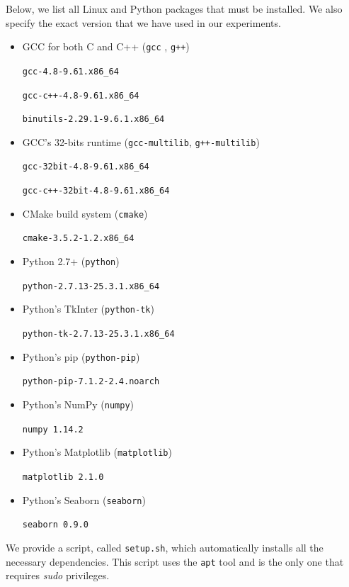 {Below, we list all Linux and Python packages that must be installed. We also specify the exact version that we have used in our experiments.

\begin{itemize}
  \item GCC for both C and C++ (\texttt{gcc} , \texttt{g++})

\texttt{gcc-4.8-9.61.x86\_64}

\texttt{gcc-c++-4.8-9.61.x86\_64}

\texttt{binutils-2.29.1-9.6.1.x86\_64}

  \item GCC's 32-bits runtime (\texttt{gcc-multilib}, \texttt{g++-multilib})

\texttt{gcc-32bit-4.8-9.61.x86\_64}

\texttt{gcc-c++-32bit-4.8-9.61.x86\_64}

  \item CMake build system (\texttt{cmake})

\texttt{cmake-3.5.2-1.2.x86\_64}

  \item Python 2.7+ (\texttt{python})

\texttt{python-2.7.13-25.3.1.x86\_64}

  \item Python's TkInter (\texttt{python-tk})

\texttt{python-tk-2.7.13-25.3.1.x86\_64}

  \item Python's pip (\texttt{python-pip})

\texttt{python-pip-7.1.2-2.4.noarch}

  \item Python's NumPy (\texttt{numpy})

\texttt{numpy 1.14.2}

  \item Python's Matplotlib (\texttt{matplotlib})

\texttt{matplotlib 2.1.0}

  \item Python's Seaborn (\texttt{seaborn})

\texttt{seaborn 0.9.0}

\end{itemize}

We provide a script, called \texttt{setup.sh}, which automatically installs
all the necessary dependencies. This script uses the \texttt{apt} tool and is the only one that requires \textit{sudo} privileges.

}
